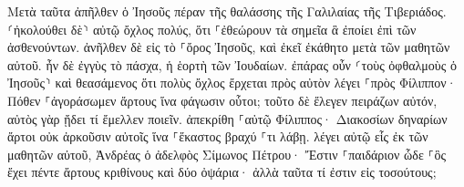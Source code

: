 \documentclass{openreader}
\begin{document}
Μετὰ ταῦτα ἀπῆλθεν ὁ Ἰησοῦς πέραν τῆς θαλάσσης τῆς Γαλιλαίας τῆς Τιβεριάδος. 
⸂ἠκολούθει δὲ⸃ αὐτῷ ὄχλος πολύς, ὅτι ⸀ἐθεώρουν τὰ σημεῖα ἃ ἐποίει ἐπὶ τῶν ἀσθενούντων. 
ἀνῆλθεν δὲ εἰς τὸ ⸀ὄρος Ἰησοῦς, καὶ ἐκεῖ ἐκάθητο μετὰ τῶν μαθητῶν αὐτοῦ. 
ἦν δὲ ἐγγὺς τὸ πάσχα, ἡ ἑορτὴ τῶν Ἰουδαίων. 
ἐπάρας οὖν ⸂τοὺς ὀφθαλμοὺς ὁ Ἰησοῦς⸃ καὶ θεασάμενος ὅτι πολὺς ὄχλος ἔρχεται πρὸς αὐτὸν λέγει ⸀πρὸς Φίλιππον· Πόθεν ⸀ἀγοράσωμεν ἄρτους ἵνα φάγωσιν οὗτοι; 
τοῦτο δὲ ἔλεγεν πειράζων αὐτόν, αὐτὸς γὰρ ᾔδει τί ἔμελλεν ποιεῖν. 
ἀπεκρίθη ⸀αὐτῷ Φίλιππος· Διακοσίων δηναρίων ἄρτοι οὐκ ἀρκοῦσιν αὐτοῖς ἵνα ⸀ἕκαστος βραχύ ⸀τι λάβῃ. 
λέγει αὐτῷ εἷς ἐκ τῶν μαθητῶν αὐτοῦ, Ἀνδρέας ὁ ἀδελφὸς Σίμωνος Πέτρου· 
Ἔστιν ⸀παιδάριον ὧδε ⸀ὃς ἔχει πέντε ἄρτους κριθίνους καὶ δύο ὀψάρια· ἀλλὰ ταῦτα τί ἐστιν εἰς τοσούτους; 
\end{document}
